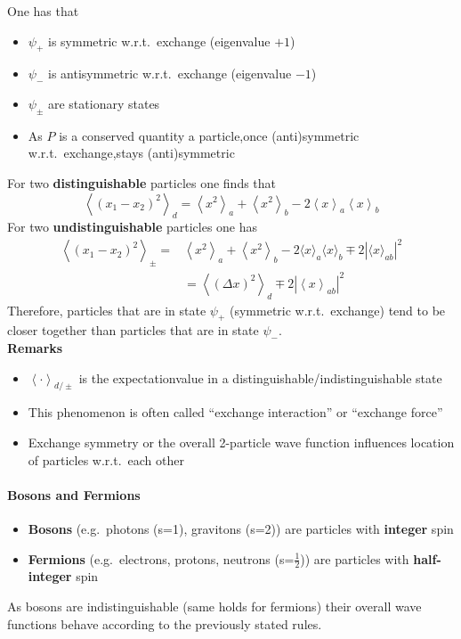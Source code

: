 One has that
\begin{itemize}
    \item $\psi_{+}$ is symmetric w.r.t.\ exchange (eigenvalue $+1$)
    \item $\psi_{-}$ is antisymmetric w.r.t.\ exchange (eigenvalue $-1$)
    \item $\psi_{\pm}$ are stationary states
    \item As $P$ is a conserved quantity a particle,\newline once (anti)symmetric w.r.t.\ exchange,\newline stays (anti)symmetric
\end{itemize}
For two \textbf{distinguishable} particles one finds that
\begin{equation*}
    \left\langle{\left(x_{1}-x_{2}\right)}^{2}\right\rangle_{d}=\left\langle x^{2}\right\rangle_{a}+\left\langle x^{2}\right\rangle_{b}-2\left\langle x\right\rangle_{a}\left\langle x\right\rangle_{b}
\end{equation*}
For two \textbf{undistinguishable} particles one has
\begin{align*}
    \left\langle{\left(x_{1}-x_{2}\right)}^{2}\right\rangle_{\pm}= & \left\langle x^{2}\right\rangle_{a}+\left\langle x^{2}\right\rangle_{b}-2\langle x\rangle_{a}\langle x\rangle_{b}\mp2|\langle x\rangle_{ab}|^{2} \\
                                                                   & =\left\langle{\left(\Delta x\right)}^{2}\right\rangle_{d}\mp2\left|\left\langle x\right\rangle_{ab}\right|^{2}
\end{align*}
Therefore, particles that are in state $\psi_{+}$ (symmetric w.r.t.\ exchange) tend to be closer together than particles that are in state $\psi_{-}$.\\
\textbf{Remarks}
\begin{itemize}
    \item $\left\langle\cdot\right\rangle_{d/\pm}$ is the expectationvalue in a distinguishable/indistinguishable state
    \item This phenomenon is often called ``exchange interaction'' or ``exchange force''
    \item Exchange symmetry or the overall 2-particle wave function influences location of particles w.r.t.\ each other
\end{itemize}

\paragraph{Bosons and Fermions}
\begin{itemize}
    \item \textbf{Bosons} (e.g.\ photons (s=1), gravitons (s=2)) are particles with \textbf{integer} spin
    \item \textbf{Fermions} (e.g.\ electrons, protons, neutrons (s=$\frac{1}{2}$)) are particles with \textbf{half-integer} spin
\end{itemize}
As bosons are indistinguishable (same holds for fermions) their overall wave functions behave according to the previously stated rules.


